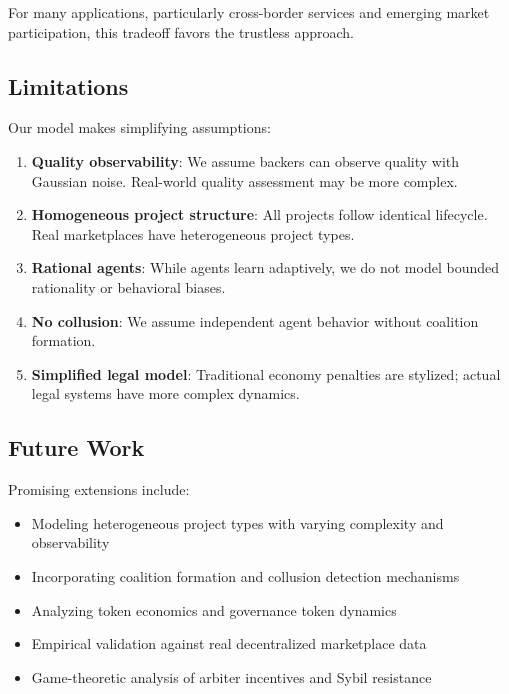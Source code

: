 \documentclass[11pt,a4paper]{article}
\begin{document}
For many applications, particularly cross-border services and emerging market participation, this tradeoff favors the trustless approach.

\subsection{Limitations}

Our model makes simplifying assumptions:

\begin{enumerate}
    \item \textbf{Quality observability}: We assume backers can observe quality with Gaussian noise. Real-world quality assessment may be more complex.

    \item \textbf{Homogeneous project structure}: All projects follow identical lifecycle. Real marketplaces have heterogeneous project types.

    \item \textbf{Rational agents}: While agents learn adaptively, we do not model bounded rationality or behavioral biases.

    \item \textbf{No collusion}: We assume independent agent behavior without coalition formation.

    \item \textbf{Simplified legal model}: Traditional economy penalties are stylized; actual legal systems have more complex dynamics.
\end{enumerate}

\subsection{Future Work}

Promising extensions include:

\begin{itemize}
    \item Modeling heterogeneous project types with varying complexity and observability
    \item Incorporating coalition formation and collusion detection mechanisms
    \item Analyzing token economics and governance token dynamics
    \item Empirical validation against real decentralized marketplace data
    \item Game-theoretic analysis of arbiter incentives and Sybil resistance
\end{itemize}
\end{document}
